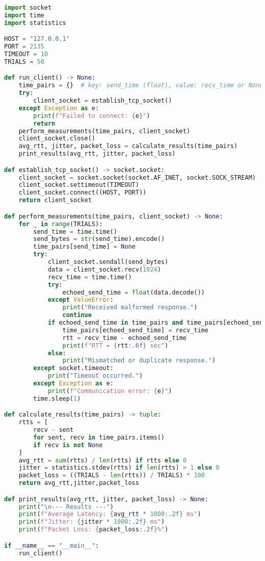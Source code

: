 \footnotesize
\begin{lstlisting}[language=python, breaklines=true, breakatwhitespace=true, showstringspaces=false]
import socket
import time
import statistics

HOST = "127.0.0.1"
PORT = 2135
TIMEOUT = 10
TRIALS = 50

def run_client() -> None:
    time_pairs = {}  # key: send_time (float), value: recv_time or None
    try:
        client_socket = establish_tcp_socket()
    except Exception as e:
        print(f"Failed to connect: {e}")
        return
    perform_measurements(time_pairs, client_socket)
    client_socket.close()
    avg_rtt, jitter, packet_loss = calculate_results(time_pairs)
    print_results(avg_rtt, jitter, packet_loss)

def establish_tcp_socket() -> socket.socket:
    client_socket = socket.socket(socket.AF_INET, socket.SOCK_STREAM)
    client_socket.settimeout(TIMEOUT)
    client_socket.connect((HOST, PORT))
    return client_socket

def perform_measurements(time_pairs, client_socket) -> None:
    for _ in range(TRIALS):
        send_time = time.time()
        send_bytes = str(send_time).encode()
        time_pairs[send_time] = None
        try:
            client_socket.sendall(send_bytes)
            data = client_socket.recv(1024)
            recv_time = time.time()
            try:
                echoed_send_time = float(data.decode())
            except ValueError:
                print("Received malformed response.")
                continue
            if echoed_send_time in time_pairs and time_pairs[echoed_send_time] is None:
                time_pairs[echoed_send_time] = recv_time
                rtt = recv_time - echoed_send_time
                print(f"RTT = {rtt:.6f} sec")
            else:
                print("Mismatched or duplicate response.")
        except socket.timeout:
            print("Timeout occurred.")
        except Exception as e:
            print(f"Communication error: {e}")
        time.sleep(1)

def calculate_results(time_pairs) -> tuple:
    rtts = [
        recv - sent
        for sent, recv in time_pairs.items()
        if recv is not None
    ]
    avg_rtt = sum(rtts) / len(rtts) if rtts else 0
    jitter = statistics.stdev(rtts) if len(rtts) > 1 else 0
    packet_loss = ((TRIALS - len(rtts)) / TRIALS) * 100
    return avg_rtt,jitter,packet_loss

def print_results(avg_rtt, jitter, packet_loss) -> None:
    print("\n--- Results ---")
    print(f"Average Latency: {avg_rtt * 1000:.2f} ms")
    print(f"Jitter: {jitter * 1000:.2f} ms")
    print(f"Packet Loss: {packet_loss:.2f}%")

if __name__ == "__main__":
    run_client()

\end{lstlisting}
\normalsize